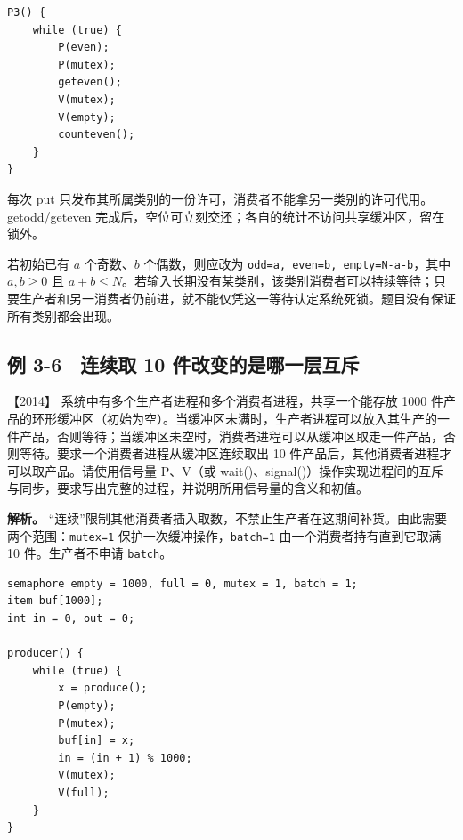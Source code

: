 \par\medskip\noindent
\begin{minipage}{\linewidth}
\begin{verbatim}
P3() {
    while (true) {
        P(even);
        P(mutex);
        geteven();
        V(mutex);
        V(empty);
        counteven();
    }
}
\end{verbatim}
\end{minipage}\par\medskip

每次 put 只发布其所属类别的一份许可，消费者不能拿另一类别的许可代用。getodd/geteven 完成后，空位可立刻交还；各自的统计不访问共享缓冲区，留在锁外。

若初始已有 \(a\) 个奇数、\(b\) 个偶数，则应改为 \allowbreak{}\texttt{odd=a,}\allowbreak{}\texttt{\ even=b,}\allowbreak{}\texttt{\ empty=N-a-b}，其中 \(a,b\ge0\) 且 \(a+b\le N\)。若输入长期没有某类别，该类别消费者可以持续等待；只要生产者和另一消费者仍前进，就不能仅凭这一等待认定系统死锁。题目没有保证所有类别都会出现。

\subsection{例 3-6　连续取 10 件改变的是哪一层互斥}\label{ex-2014}

\noindent{}【2014】 系统中有多个生产者进程和多个消费者进程，共享一个能存放 1000 件产品的环形缓冲区（初始为空）。当缓冲区未满时，生产者进程可以放入其生产的一件产品，否则等待；当缓冲区未空时，消费者进程可以从缓冲区取走一件产品，否则等待。要求一个消费者进程从缓冲区连续取出 10 件产品后，其他消费者进程才可以取产品。请使用信号量 P、V（或 wait()、signal()）操作实现进程间的互斥与同步，要求写出完整的过程，并说明所用信号量的含义和初值。


\textbf{解析。} ``连续''限制其他消费者插入取数，不禁止生产者在这期间补货。由此需要两个范围：\allowbreak{}\texttt{mutex=1} 保护一次缓冲操作，\allowbreak{}\texttt{batch=1} 由一个消费者持有直到它取满 10 件。生产者不申请 \allowbreak{}\texttt{batch}。

\par\medskip\noindent
\begin{minipage}{\linewidth}
\begin{verbatim}
semaphore empty = 1000, full = 0, mutex = 1, batch = 1;
item buf[1000];
int in = 0, out = 0;

producer() {
    while (true) {
        x = produce();
        P(empty);
        P(mutex);
        buf[in] = x;
        in = (in + 1) % 1000;
        V(mutex);
        V(full);
    }
}
\end{verbatim}
\end{minipage}\par\medskip

